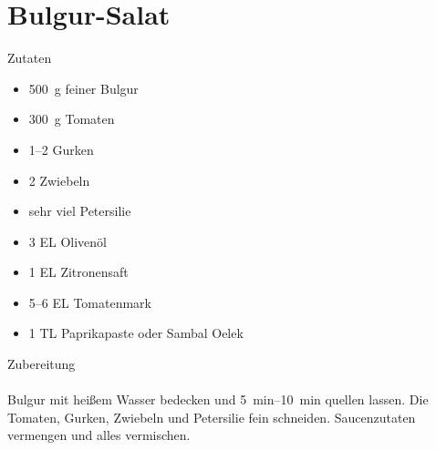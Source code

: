 \section*{Bulgur-Salat}
\ihead{}\ohead{}
\cfoot{}
{\Large Zutaten}
\begin{multicols}{2}
\begin{itemize}
    \item \SI{500}{g} feiner Bulgur
    \item \SI{300}{g} Tomaten
    \item \numrange{1}{2} Gurken
    \item \num{2} Zwiebeln
    \item sehr viel Petersilie
    \item \num{3} EL Olivenöl
    \item \num{1} EL Zitronensaft
    \item \numrange{5}{6} EL Tomatenmark
    \item \num{1} TL Paprikapaste oder Sambal Oelek
\end{itemize}
\columnbreak
\end{multicols}
\noindent
{\Large Zubereitung}\\
\\
Bulgur mit heißem Wasser bedecken und \SIrange{5}{10}{min} quellen lassen.
Die Tomaten, Gurken, Zwiebeln und Petersilie fein schneiden.
Saucenzutaten vermengen und alles vermischen. 